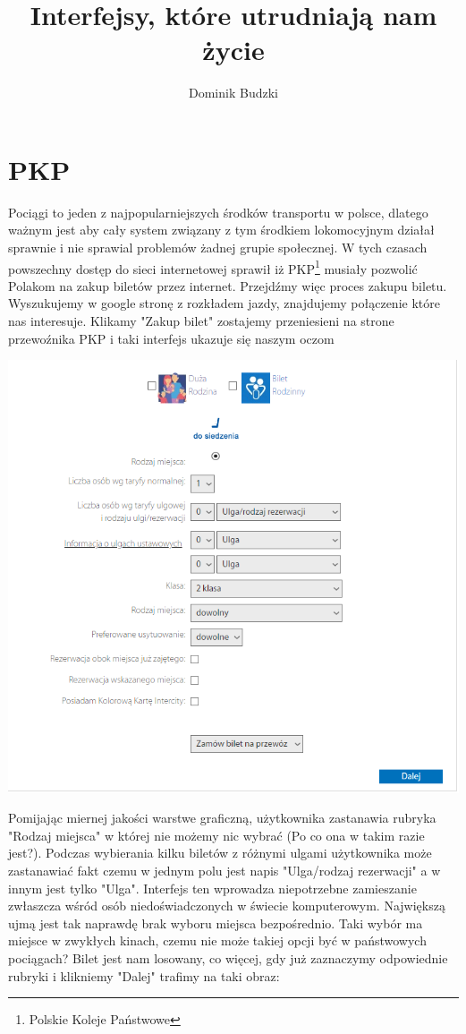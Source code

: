 \documentclass{article}
\title{Interfejsy, które utrudniają nam życie}
\author{Dominik Budzki}
\begin{document}
\maketitle

\section{PKP}
Pociągi to jeden z najpopularniejszych środków transportu w polsce,
dlatego ważnym jest aby cały system związany z tym środkiem lokomocyjnym działał sprawnie i nie sprawial problemów żadnej grupie społecznej.
W tych czasach powszechny dostęp do sieci internetowej sprawił iż PKP\footnote{Polskie Koleje Państwowe} musiały pozwolić Polakom na zakup biletów przez internet.
Przejdźmy więc proces zakupu biletu. Wyszukujemy w google stronę z rozkładem jazdy, znajdujemy połączenie które nas interesuje.
Klikamy "Zakup bilet" zostajemy przeniesieni na strone przewoźnika PKP i taki interfejs ukazuje się naszym oczom

\begin{center}
    \includegraphics[scale=0.50]{Kupowanie-biletu.PNG}
\end{center}

\newpage
Pomijając miernej jakości warstwe graficzną, użytkownika zastanawia rubryka "Rodzaj miejsca" w której nie możemy nic wybrać (Po co ona w takim razie jest?).
Podczas wybierania kilku biletów z różnymi ulgami użytkownika może zastanawiać fakt czemu w jednym polu jest napis "Ulga/rodzaj rezerwacji" a w innym jest tylko "Ulga".
Interfejs ten wprowadza niepotrzebne zamieszanie zwłaszcza wśród osób niedoświadczonych w świecie komputerowym.
Największą ujmą jest tak naprawdę brak wyboru miejsca bezpośrednio. Taki wybór ma miejsce w zwykłych kinach, czemu nie może takiej opcji być w państwowych pociągach?
Bilet jest nam losowany, co więcej, gdy już zaznaczymy odpowiednie rubryki i klikniemy "Dalej" trafimy na taki obraz:
\end{document}
